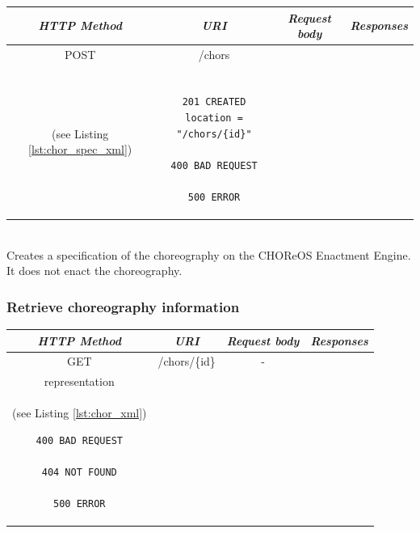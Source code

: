 \documentclass[a4paper, 10pt]{article}
\newcommand{\ee}{CHOReOS Enactment Engine}
\begin{document}
\begin{tabular}{|c|c|c|c|}
\hline 
\itshape{HTTP Method} & \itshape{URI} & \itshape{Request body} & \itshape{Responses} \\ 
\hline 
POST & /chors & 

\begin{minipage}{2in}
\verb!ChorSpec! XML representation \\ 
(see Listing \ref{lst:chor_spec_xml})
\end{minipage} 
&

\begin{minipage}{2in}
\begin{verbatim}

201 CREATED
location = "/chors/{id}"

400 BAD REQUEST

500 ERROR

\end{verbatim}
\end{minipage} 
\\ 
\hline 
\end{tabular} \\

Creates a specification of the choreography on the \ee.
It does not enact the choreography. \\

\subsubsection*{Retrieve choreography information}

\begin{tabular}{|c|c|c|c|}
\hline 
\itshape{HTTP Method} & \itshape{URI} & \itshape{Request body} & \itshape{Responses} \\ 
\hline 
GET & /chors/\{id\} & - &
\begin{minipage}{2in}
\begin{verbatim}

200 OK
location = "/chors/{id}"

Body: 
\end{verbatim}
\verb!Choreography! XML \\
representation \\
(see Listing \ref{lst:chor_xml})
\begin{verbatim}
400 BAD REQUEST

404 NOT FOUND

500 ERROR

\end{verbatim}
\end{minipage} 
\\ 
\hline 
\end{tabular} \\
\end{document}
